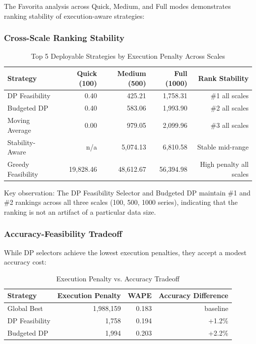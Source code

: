 The Favorita analysis across Quick, Medium, and Full modes demonstrates ranking stability of execution-aware strategies:

\subsubsection{Cross-Scale Ranking Stability}

\begin{table}[htbp]
\centering
\caption{Top 5 Deployable Strategies by Execution Penalty Across Scales}
\label{tab:cross-scale-ranking}
\begin{tabular}{lrrrr}
\toprule
\textbf{Strategy} & \textbf{Quick (100)} & \textbf{Medium (500)} & \textbf{Full (1000)} & \textbf{Rank Stability} \\
\midrule
DP Feasibility & 0.40 & 425.21 & 1,758.31 & \#1 all scales \\
Budgeted DP & 0.40 & 583.06 & 1,993.90 & \#2 all scales \\
Moving Average & 0.00 & 979.05 & 2,099.96 & \#3 all scales \\
Stability-Aware & n/a & 5,074.13 & 6,810.58 & Stable mid-range \\
Greedy Feasibility & 19,828.46 & 48,612.67 & 56,394.98 & High penalty all scales \\
\bottomrule
\end{tabular}
\end{table}

Key observation: The DP Feasibility Selector and Budgeted DP maintain \#1 and \#2 rankings across all three scales (100, 500, 1000 series), indicating that the ranking is not an artifact of a particular data size.

\subsubsection{Accuracy-Feasibility Tradeoff}

While DP selectors achieve the lowest execution penalties, they accept a modest accuracy cost:

\begin{table}[htbp]
\centering
\caption{Execution Penalty vs. Accuracy Tradeoff}
\label{tab:accuracy-penalty-tradeoff}
\begin{tabular}{lrr|r}
\toprule
\textbf{Strategy} & \textbf{Execution Penalty} & \textbf{WAPE} & \textbf{Accuracy Difference} \\
\midrule
Global Best & 1,988,159 & 0.183 & baseline \\
DP Feasibility & 1,758 & 0.194 & +1.2\% \\
Budgeted DP & 1,994 & 0.203 & +2.2\% \\
\bottomrule
\end{tabular}
\end{table}

